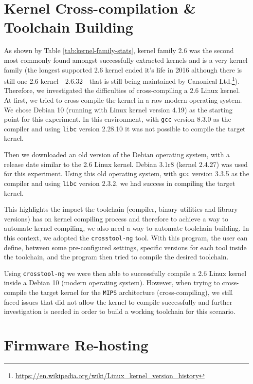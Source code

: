 \section{Kernel Cross-compilation \& Toolchain Building}

As shown by Table \ref{tab:kernel-family-stats}, kernel family 2.6 was the second most commonly found amongst successfully extracted kernels and is a very kernel family (the longest supported 2.6 kernel ended it's life in 2016 although there is still one 2.6 kernel - 2.6.32 - that is still being maintained by Canonical Ltd.\footnote{\url{https://en.wikipedia.org/wiki/Linux_kernel_version_history}}). Therefore, we investigated the difficulties of cross-compiling a 2.6 Linux kernel. At first, we tried to cross-compile the kernel in a raw modern operating system. We chose Debian 10 (running with Linux kernel version 4.19) as the starting point for this experiment. In this environment, with {\tt gcc} version 8.3.0 as the compiler and using {\tt libc} version 2.28.10 it was not possible to compile the target kernel.

Then we downloaded an old version of the Debian operating system, with a release date similar to the 2.6 Linux kernel. Debian 3.1r8 (kernel 2.4.27) was used for this experiment. Using this old operating system, with {\tt gcc} version 3.3.5 as the compiler and using {\tt libc} version 2.3.2, we had success in compiling the target kernel.

This highlights the impact the toolchain (compiler, binary utilities and library versions) has on kernel compiling process and therefore to achieve a way to automate kernel compiling, we also need a way to automate toolchain building. In this context, we adopted the {\tt crosstool-ng} tool. With this program, the user can define, between some pre-configured settings, specific versions for each tool inside the toolchain, and the program then tried to compile the desired toolchain.

Using {\tt crosstool-ng} we were then able to successfully compile a 2.6 Linux kernel inside a Debian 10 (modern operating system). However, when trying to cross-compile the target kernel for the {\tt MIPS} architecture (cross-compiling), we still faced issues that did not allow the kernel to compile successfully and further investigation is needed in order to build a working toolchain for this scenario.

\section{Firmware Re-hosting}

